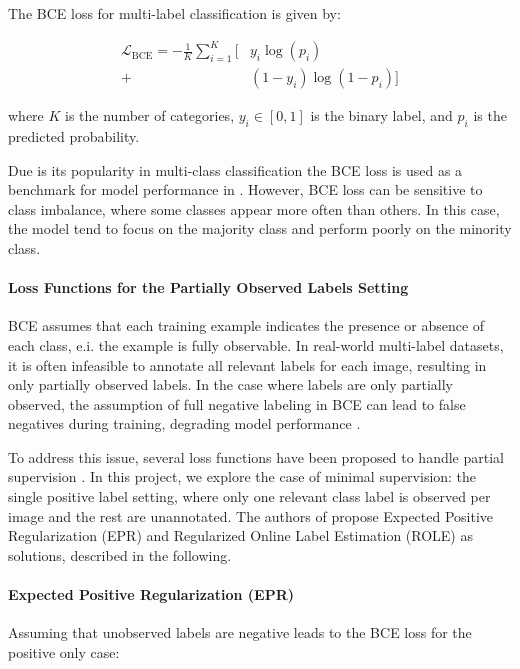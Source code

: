 \documentclass[lettersize,journal]{IEEEtran}
\begin{document}
The BCE loss for multi-label classification is given by:

\begin{equation}
\begin{aligned}
\mathcal{L}_{\text{BCE}} = -\frac{1}{K} \sum_{i=1}^{K} \bigl[ &y_i\log(p_i) \\
+ &(1-y_i)\log(1 - p_i) \bigr]
\end{aligned}
\end{equation}

\noindent where $K$ is the number of categories, $y_i\in[0,1]$ is the binary label, and $p_i$ is the predicted probability.

Due is its popularity in multi-class classification the BCE loss is used as a benchmark for model performance in \cite{mlsp}. However, BCE loss can be sensitive to class imbalance, where some classes appear more often than others. In this case, the model tend to focus on the majority class and perform poorly on the minority class. 

\paragraph{Loss Functions for the Partially Observed Labels Setting}
BCE assumes that each training example indicates the presence or absence of each class, e.i. the example is fully observable. In real-world multi-label datasets, it is often infeasible to annotate all relevant labels for each image, resulting in only partially observed labels. In the case where labels are only partially observed, the assumption of full negative labeling in BCE can lead to false negatives during training, degrading model performance \cite{mlsp}. 

To address this issue, several loss functions have been proposed to handle partial supervision \cite{mlsp}. In this project, we explore the case of minimal supervision: the single positive label setting, where only one relevant class label is observed per image and the rest are unannotated. The authors of \cite{mlsp} propose Expected Positive Regularization (EPR) and Regularized Online Label Estimation (ROLE) as solutions, described in the following.

\paragraph{Expected Positive Regularization (EPR)}
Assuming that unobserved labels are negative leads to the BCE loss for the positive only case:
\end{document}
